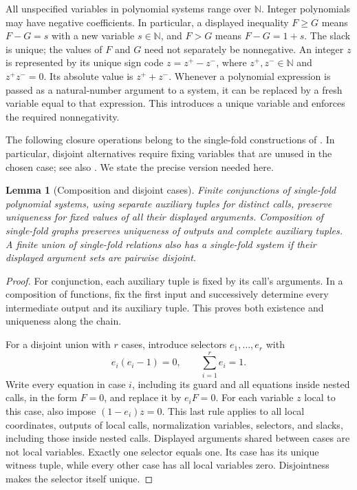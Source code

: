 \documentclass[11pt]{article}
\newtheorem{lemma}[theorem]{Lemma}
\theoremstyle{definition}
\theoremstyle{remark}
\newcommand{\NN}{\mathbb N}
\begin{document}
All unspecified variables in polynomial systems range over $\NN$. Integer
polynomials may have negative coefficients. In particular, a displayed
inequality $F\ge G$ means $F-G=s$ with a new variable $s\in\NN$, and $F>G$
means $F-G=1+s$. The slack is unique; the values of $F$ and $G$ need not
separately be nonnegative. An integer $z$ is represented by its unique sign
code $z=z^+-z^-$, where $z^+,z^-\in\NN$ and $z^+z^-=0$.
Its absolute value is $z^++z^-$. Whenever a polynomial expression is passed as
a natural-number argument to a system, it can be replaced by a fresh variable
equal to that expression. This introduces a unique variable and enforces the
required nonnegativity.

The following closure operations belong to the single-fold constructions of
\cite[Sections~3.1--3.3]{mati1974}. In particular, disjoint alternatives require
fixing variables that are unused in the chosen case; see also
\cite[Section~2, pp.~590--591]{cco2024}. We state the precise version needed
here.

\begin{lemma}[Composition and disjoint cases]\label{lem:composition}
Finite conjunctions of single-fold polynomial systems, using separate
auxiliary tuples for distinct calls, preserve uniqueness for fixed values of
all their displayed arguments. Composition of single-fold graphs preserves
uniqueness of outputs and complete auxiliary tuples. A finite union of
single-fold relations also has a single-fold system if their displayed
argument sets are pairwise disjoint.
\end{lemma}
\begin{proof}
For conjunction, each auxiliary tuple is fixed by its call's arguments. In a
composition of functions, fix the first input and successively determine every
intermediate output and its auxiliary tuple. This proves both existence and
uniqueness along the chain.

For a disjoint union with $r$ cases, introduce selectors $e_1,\ldots,e_r$ with
\[
 e_i(e_i-1)=0,\qquad \sum_{i=1}^r e_i=1.
\]
Write every equation in case $i$, including its guard and all equations inside
nested calls, in the form $F=0$, and replace it by $e_iF=0$. For each variable
$z$ local to this case, also impose $(1-e_i)z=0$. This last rule applies to all
local coordinates, outputs of local calls, normalization variables, selectors,
and slacks, including those inside nested calls. Displayed arguments shared
between cases are not local variables. Exactly one selector equals one.
Its case has its unique witness tuple, while every other case has all local
variables zero. Disjointness makes the selector itself unique.
\end{proof}
\end{document}
